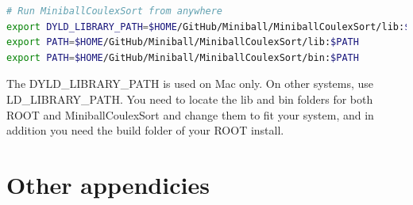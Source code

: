 \documentclass[twoside,english]{uiofysmaster/uiofysmaster}
\begin{document}
\begin{appendices}
\begin{lstlisting}[language=sh]
# Run MiniballCoulexSort from anywhere
export DYLD_LIBRARY_PATH=$HOME/GitHub/Miniball/MiniballCoulexSort/lib:$DYLD_LIBRARY_PATH
export PATH=$HOME/GitHub/Miniball/MiniballCoulexSort/lib:$PATH
export PATH=$HOME/GitHub/Miniball/MiniballCoulexSort/bin:$PATH
\end{lstlisting}
The DYLD\_LIBRARY\_PATH is used on Mac only. On other systems, use \newline LD\_LIBRARY\_PATH. You need to locate the lib and bin folders for both ROOT and MiniballCoulexSort and change them to fit your system, and in addition you need the build folder of your ROOT install.



\chapter{Other appendicies}



\end{appendices}



%


\end{document}
